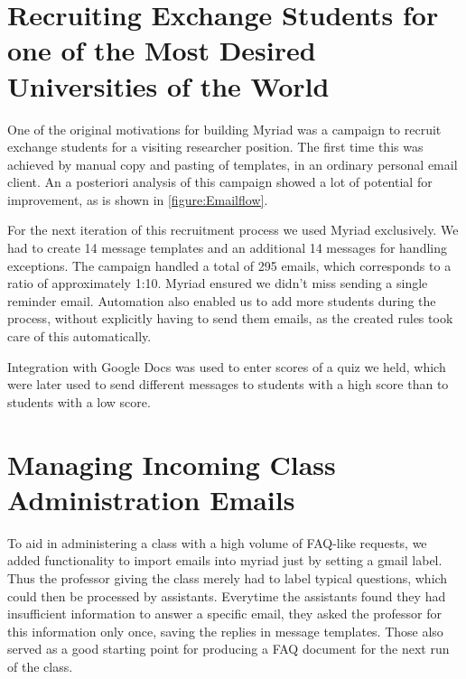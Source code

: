 \section{Recruiting Exchange Students for one of the Most Desired Universities of the World}

One of the original motivations for building Myriad was a campaign to recruit exchange students for a visiting researcher position. The first time this was achieved by manual copy and pasting of templates, in an ordinary personal email client. An a posteriori analysis of this campaign showed a lot of potential for improvement, as is shown in \autoref{figure:Emailflow}.


For the next iteration of this recruitment process we used Myriad exclusively. We had to create 14 message templates and an additional 14 messages for handling exceptions. The campaign handled a total of 295 emails, which corresponds to a ratio of approximately 1:10. Myriad ensured we didn’t miss sending a single reminder email. Automation also enabled us to add more students during the process, without explicitly having to send them emails, as the created rules took care of this automatically.

Integration with Google Docs was used to enter scores of a quiz we held, which were later used to send different messages to students with a high score than to students with a low score.

\section{Managing Incoming Class Administration Emails}

To aid in administering a class with a high volume of FAQ-like requests, we added functionality to import emails into myriad just by setting a gmail label. Thus the professor giving the class merely had to label typical questions, which could then be processed by assistants. Everytime the assistants found they had insufficient information to answer a specific email, they asked the professor for this information only once, saving the replies in message templates. Those also served as a good starting point for producing a FAQ document for the next run of the class.

